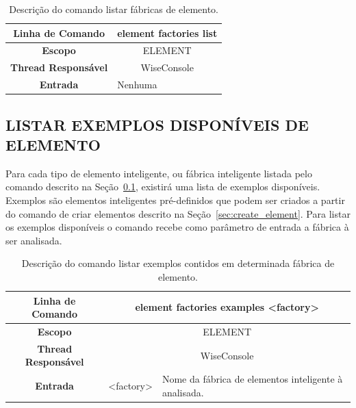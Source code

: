 \begin{center}
	\begin{table}[!htbp]
		\begin{tabular}{|c|m{}|}
			\hline
			\textbf{Linha de Comando} & \multicolumn{1}{c|}{element factories list} \\
			\hline
			\textbf{Escopo} & \multicolumn{1}{c|}{ELEMENT} \\
			\hline
			\textbf{Thread Responsável} & \multicolumn{1}{c|}{WiseConsole} \\
			\hline
			\textbf{Entrada} & Nenhuma \\
			\hline
		\end{tabular}
		\caption{Descrição do comando listar fábricas de elemento.}
		\label{tab:list_element_factories}
	\end{table}
\end{center}

\subsection{LISTAR EXEMPLOS DISPONÍVEIS DE ELEMENTO}\label{sec:list_example_element_factories}

Para cada tipo de elemento inteligente, ou fábrica inteligente listada pelo comando descrito na Seção~\ref{sec:list_example_element_factories}, existirá uma lista de exemplos disponíveis. Exemplos são elementos inteligentes pré-definidos que podem ser criados a partir do comando de criar elementos descrito na Seção~\ref{sec:create_element}. Para listar os exemplos disponíveis o comando recebe como parâmetro de entrada a fábrica à ser analisada.

\begin{center}
	\begin{table}[!htbp]
		\begin{tabular}{|c|c|m{}|}
			\hline
			\textbf{Linha de Comando} & \multicolumn{2}{c|}{element factories examples <factory>} \\
			\hline
			\textbf{Escopo} & \multicolumn{2}{c|}{ELEMENT} \\
			\hline
			\textbf{Thread Responsável} & \multicolumn{2}{c|}{WiseConsole} \\
			\hline
			\textbf{Entrada} & <factory> & Nome da fábrica de elementos inteligente à analisada. \\
			\hline
		\end{tabular}
		\caption{Descrição do comando listar exemplos contidos em determinada fábrica de elemento.}
		\label{tab:list_element_ex_factories}
	\end{table}
\end{center}

